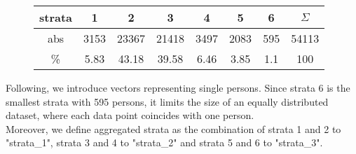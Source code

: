 	\vspace*{-3em}
	\begin{figure}[H]
		\centering
		\setlength\tabcolsep{.2cm}
		\begin{tabular}{c|ccccccc}
			strata &  1   &   2   &   3   &  4   &  5   &  6  & $\Sigma$ \\ \hline
			abs   & 3153 & 23367 & 21418 & 3497 & 2083 & 595 &  54113   \\
			\%   & 5.83 & 43.18 & 39.58 & 6.46 & 3.85 & 1.1 &   100
		\end{tabular}
		\vspace*{-2.5em}
	\end{figure}
	Following, we introduce vectors representing single persons. Since strata 6 is the smallest strata with 595 persons, it limits the size of an equally distributed dataset, where each data point coincides with one person.\\

	Moreover, we define aggregated strata as the combination of strata 1 and 2 to "strata\_1", strata 3 and 4 to "strata\_2" and strata 5 and 6 to "strata\_3". 
	
